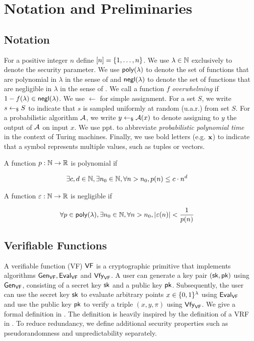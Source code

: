 
\chapter{Notation and Preliminaries}\label{ch:notation}

\section{Notation}
For a positive integer $n$ define $[n] = \{1,\ldots,n\}$.
We use $\lambda \in \mathbb{N}$ exclusively to denote the security parameter.
We use $\poly$ to denote the set of functions that are polynomial in $\lambda$
in the sense of  and $\negl$ to denote the set of functions that are 
negligible in $\lambda$ in the sense of .
We call a function $f$ \textit{overwhelming} if $1 - f(\lambda) \in \negl$.
We use $\gets$ for simple assignment.
For a set $S$, we write $s \gets_\$ S$ to indicate that $s$ is sampled uniformly at random (u.a.r.) from 
set $S$. For a probabilistic algorithm $\mathcal{A}$, we write $y \gets_\$ \mathcal{A}(x)$ to denote assigning to 
$y$ the output of $\mathcal{A}$ on input $x$. We use ppt. to abbreviate \textit{probabilistic polynomial time} in the context of 
Turing machines. Finally, we use bold letters (e.g. $\mathbf{x}$) to indicate that a symbol represents 
multiple values, such as tuples or vectors.

\begin{definition}\label{def:polynomial}
	A function $p: \mathbb{N} \to \mathbb{R}$ is polynomial if

	\[
		\exists c,d \in \mathbb{N}, \exists n_0 \in \mathbb{N}, \forall n > n_0, p(n) \le c \cdot n^d
	\]
\end{definition}

\begin{definition}\label{def:negligible}
	A function $\varepsilon: \mathbb{N} \to \mathbb{R}$ is negligible if

	\[
		\forall p \in \poly, \exists n_0 \in \N, \forall n > n_0, |\eps(n)| < \frac{1}{p(n)}
	\]
\end{definition}

\newpage

\section{Verifiable Functions}
A verifiable function (VF) $ \textup{\textsf{VF}} $ is a cryptographic primitive that implements algorithms 
$\alg{Gen}{VF}, \alg{Eval}{VF}$ and $\alg{Vfy}{VF}$. A user can generate a key pair $(\textup{\textsf{sk}}, \textup{\textsf{pk}})$
using $\alg{Gen}{VF}$, consisting of a secret key $\textup{\textsf{sk}}$ and a public key $\textup{\textsf{pk}}$. Subsequently, the user can use the secret key $\textup{\textsf{sk}}$
to evaluate arbitrary points $x \in \{0,1\}^\lambda$ using $\alg{Eval}{VF}$ and use the public key $\textup{\textsf{pk}}$ to 
verify a triple $(x,y,\pi)$ using $\alg{Vfy}{VF}$.
We give a formal definition in . The definition is heavily inspired by the definition of a VRF in 
\cite{TCC:HofJag16}. To reduce redundancy, we define additional security properties 
such as pseudorandomness and unpredictability separately.

